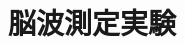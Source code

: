 \chapter{脳波測定実験}
\section{\purpose}
\section{\method}
\section{\result}
\section{\consideration}
\section{\conclusion}
